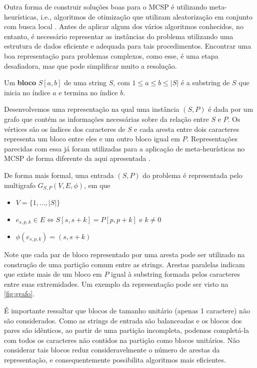 Outra forma de construir soluções boas para o MCSP é utilizando meta-heurísticas, i.e., algoritmos de otimização que utilizam aleatorização em conjunto com busca local \cite[p.~4]{yang_nature-inspired_2010}. Antes de aplicar algum dos vários algoritmos conhecidos, no entanto, é necessário representar as instâncias do problema utilizando uma estrutura de dados eficiente e adequada para tais procedimentos. Encontrar uma boa representação para problemas complexos, como esse, é uma etapa desafiadora, mas que pode simplificar muito a resolução.

\begin{definition}
    Um \textbf{bloco} $S[a, b]$ de uma string $S$, com $1 \leq a \leq b \leq |S|$ é a substring de $S$ que inicia no índice $a$ e termina no índice $b$.
\end{definition}

Desenvolvemos uma representação na qual uma instância $(S, P)$ é dada por um grafo que contém as informações necessárias sobre da relação entre $S$ e $P$. Os vértices são os índices dos caracteres de $S$ e cada aresta entre dois caracteres representa um bloco entre eles e um outro bloco igual em $P$. Representações parecidas com essa já foram utilizadas para a aplicação de meta-heurísticas no MCSP de forma diferente da aqui apresentada \cite{ferdous_solving_2014}.

De forma mais formal, uma entrada $(S, P)$ do problema é representada pelo multigrafo $G_{S, P}(V, E, \phi)$, em que

\begin{itemize}
    \item $V = \{ 1, ..., |S| \}$
    \item $e_{s, p, k} \in E \iff S[s, s + k] = P[p, p + k] \text{ e } k \neq 0$
    \item $\phi(e_{s, p, k}) = (s, s + k)$
\end{itemize}

Note que cada par de bloco representado por uma aresta pode ser utilizado na construção de uma partição comum entre as strings. Arestas paralelas indicam que existe mais de um bloco em $P$ igual à substring formada pelos caracteres entre suas extremidades. Um exemplo da representação pode ser visto na \cref{fig:grafo}.

É importante ressaltar que blocos de tamanho unitário (apenas 1 caractere) não são considerados. Como as strings de entrada são balanceadas e os blocos dos pares são idênticos, ao partir de uma partição incompleta, podemos completá-la com todos os caracteres não contidos na partição como blocos unitários. Não considerar tais blocos reduz consideravelmente o número de arestas da representação, e consequentemente possibilita algoritmos mais eficientes.

